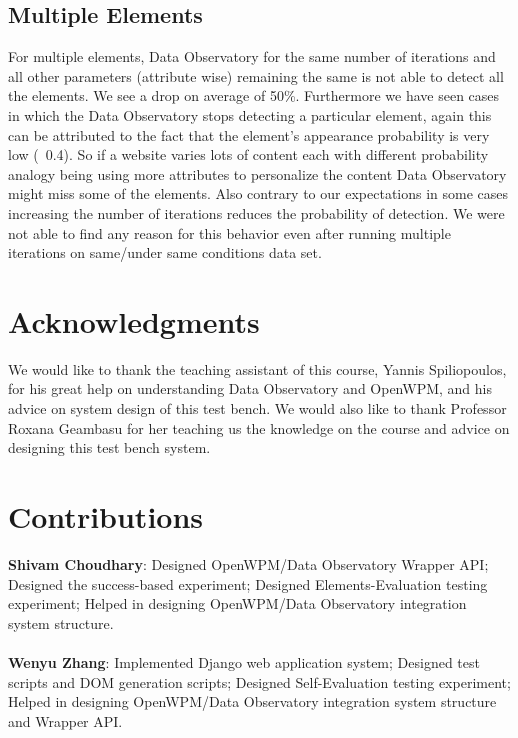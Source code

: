 \documentclass[fleqn,12pt]{SelfArx} %
\begin{document}
\subsection{Multiple Elements}
For multiple elements, Data Observatory for the same number of iterations and all other parameters (attribute wise) remaining the same is not able to detect all the elements. We see a drop on average of 50\%. Furthermore we have seen cases in which the Data Observatory stops detecting a particular element, again this can be attributed to the fact that the element’s appearance probability is very low (~0.4). So if a website varies lots of content each with different probability analogy being using more attributes to personalize the content Data Observatory might miss some of the elements. Also contrary to our expectations in some cases increasing the number of iterations reduces the probability of detection. We were not able to find any reason for this behavior even after running multiple iterations on same/under same conditions data set. 


\section*{Acknowledgments} %


We would like to thank the teaching assistant of this course, Yannis Spiliopoulos, for his great help on understanding Data Observatory and OpenWPM, and his advice on system design of this test bench. We would also like to thank Professor Roxana Geambasu for her teaching us the knowledge on the course and advice on designing this test bench system.

{}
\section*{Contributions} %
\textbf{Shivam Choudhary}: Designed OpenWPM/Data Observatory Wrapper API; Designed the success-based experiment; Designed Elements-Evaluation testing experiment; Helped in  designing OpenWPM/Data Observatory integration system structure.\\\\
\textbf{Wenyu Zhang}: Implemented Django web application system; Designed test scripts and DOM generation scripts; Designed Self-Evaluation testing experiment; Helped in designing OpenWPM/Data Observatory integration system structure and Wrapper API.
\end{document}
